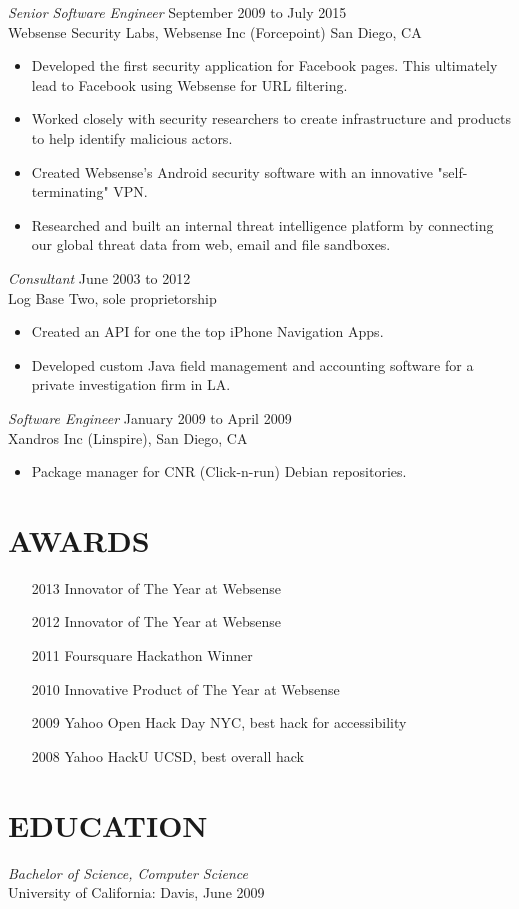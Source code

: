 \documentclass[margin]{res}
\begin{document}
\begin{resume}
{\sl Senior Software Engineer} \hfill September 2009 to July 2015 \\
Websense Security Labs, Websense Inc (Forcepoint) San Diego, CA
\begin{itemize} \itemsep -2pt
  \item Developed the first security application for Facebook pages. This ultimately lead to Facebook using Websense for URL filtering.
	\item Worked closely with security researchers to create infrastructure and products to help identify malicious actors.
	\item Created Websense's Android security software with an innovative "self-terminating" VPN.
  \item Researched and built an internal threat intelligence platform by connecting our global threat data from web, email and file sandboxes.
\end{itemize}

{\sl Consultant} \hfill  June 2003 to 2012 \\
Log Base Two, sole proprietorship
\begin{itemize}  \itemsep -2pt %
  \item Created an API for one the top iPhone Navigation Apps.
  \item Developed custom Java field management and accounting software for a private investigation firm in LA.
\end{itemize}
        
{\sl Software Engineer} \hfill  January 2009 to April 2009 \\
Xandros Inc (Linspire), San Diego, CA
\begin{itemize}  \itemsep -2pt %
  \item Package manager for CNR (Click-n-run) Debian repositories.
\end{itemize}

\section{AWARDS}
\begin{itemize} \itemsep -2pt
  \item[2013]{Innovator of The Year at Websense}
  \item[2012]{Innovator of The Year at Websense}
  \item[2011]{Foursquare Hackathon Winner}
  \item[2010]{Innovative Product of The Year at Websense}
  \item[2009]{Yahoo Open Hack Day NYC, best hack for accessibility} 
  \item[2008]{Yahoo HackU UCSD, best overall hack}
\end{itemize}
\section{EDUCATION} {\sl Bachelor of Science, Computer Science}\\
        University of California: Davis, June 2009\\

\end{resume}
\end{document}
